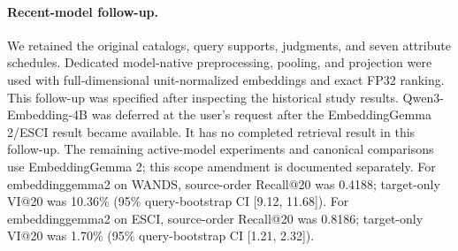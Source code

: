 \paragraph{Recent-model follow-up.} We retained the original catalogs, query supports, judgments, and seven attribute schedules. Dedicated model-native preprocessing, pooling, and projection were used with full-dimensional unit-normalized embeddings and exact FP32 ranking. This follow-up was specified after inspecting the historical study results.
Qwen3-Embedding-4B was deferred at the user's request after the EmbeddingGemma 2/ESCI result became available. It has no completed retrieval result in this follow-up. The remaining active-model experiments and canonical comparisons use EmbeddingGemma 2; this scope amendment is documented separately.
For embeddinggemma2 on WANDS, source-order Recall@20 was 0.4188; target-only VI@20 was 10.36\% (95\% query-bootstrap CI [9.12, 11.68]).
For embeddinggemma2 on ESCI, source-order Recall@20 was 0.8186; target-only VI@20 was 1.70\% (95\% query-bootstrap CI [1.21, 2.32]).
